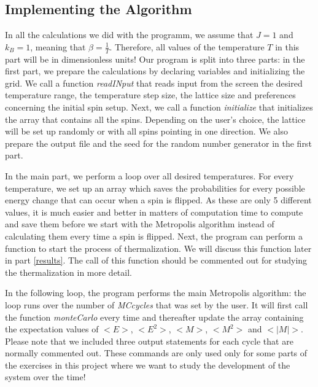 \documentclass[10pt,a4paper]{article}
\begin{document}
\subsection{Implementing the Algorithm}
In all the calculations we did with the programm, we assume that $J=1$ and $k_B=1$, meaning that $\beta=\frac{1}{T}$. Therefore, all values of the temperature $T$ in this part will be in dimensionless units!
Our program is split into three parts: in the first part, we prepare the calculations by declaring variables and initializing the grid. We call a function \emph{readINput} that reads input from the screen the desired temperature range, the temperature step size, the lattice size and preferences concerning the initial spin setup. Next, we call a function \emph{initialize} that initializes the array that contains all the spins. Depending on the user's choice, the lattice will be set up randomly or with all spins pointing in one direction. We also prepare the output file and the seed for the random number generator in the first part.

In the main part, we perform a loop over all desired temperatures. For every temperature, we set up an array which saves the probabilities for every possible energy change that can occur when a spin is flipped. As these are only 5 different values, it is much easier and better in matters of computation time to compute and save them before we start with the Metropolis algorithm instead of calculating them every time a spin is flipped.
Next, the program can perform a function to start the process of thermalization. We will discuss this function later in part \ref{results}. The call of this function should be commented out for studying the thermalization in more detail.

In the following loop, the program performs the main Metropolis algorithm: the loop runs over the number of \emph{MCcycles} that was set by the user. It will first call the function \emph{monteCarlo} every time and thereafter update the array containing the expectation values of $<E>$, $<E^2>$, $<M>$, $<M^2>$ and $<|M|>$. Please note that we included three output statements for each cycle that are normally commented out. These commands are only used only for some parts of the exercises in this project where we want to study the development of the system over the time!
\end{document}
